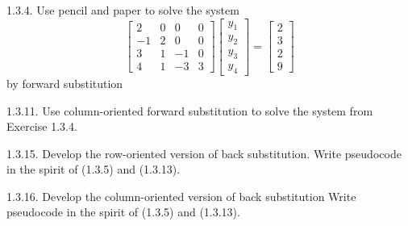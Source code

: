 \documentclass{report}
\begin{document}
    \pagebreak \bigbreak \noindent 
    \begin{mdframed}
        1.3.4. Use pencil and paper to solve the system
        \[
            \begin{bmatrix}
                2 & 0 & 0 & 0 \\
                -1 & 2 & 0 & 0 \\
                3 & 1 & -1 & 0 \\
                4 & 1 & -3 & 3
            \end{bmatrix}
            \begin{bmatrix}
                y_{1} \\
                y_{2} \\
                y_{3} \\
                y_{4}
            \end{bmatrix}
            =
            \begin{bmatrix}
                2 \\
                3 \\
                2 \\
                9
            \end{bmatrix}
        \]
        by forward substitution
    \end{mdframed}

    \pagebreak \bigbreak \noindent 
    \begin{mdframed}
        1.3.11. Use column-oriented forward substitution to solve the system from Exercise 1.3.4.
    \end{mdframed}

    \pagebreak \bigbreak \noindent 
    \begin{mdframed}
        1.3.15. Develop the row-oriented version of back substitution. Write pseudocode in the spirit of (1.3.5) and (1.3.13).
    \end{mdframed}

    \pagebreak \bigbreak \noindent 
    \begin{mdframed}
        1.3.16. Develop the column-oriented version of back substitution Write pseudocode in the spirit of (1.3.5) and (1.3.13).
    \end{mdframed}
\end{document}
